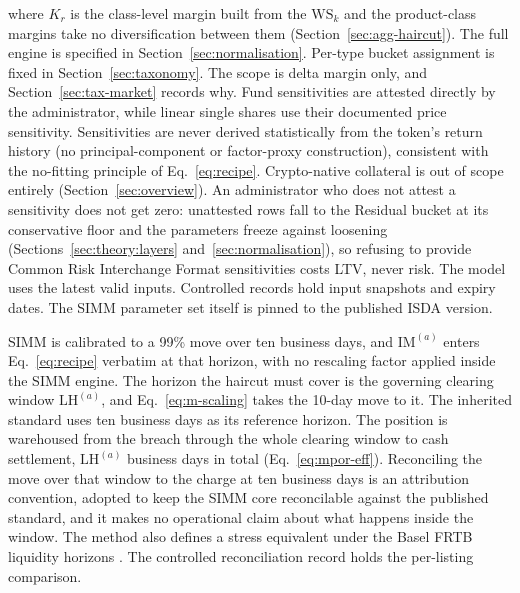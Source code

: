 where $K_r$ is the class-level margin built from the $\mathrm{WS}_k$ and the product-class margins take no diversification between them (Section~\ref{sec:agg-haircut}). The full engine is specified in Section~\ref{sec:normalisation}. Per-type bucket assignment is fixed in Section~\ref{sec:taxonomy}. The scope is delta margin only, and Section~\ref{sec:tax-market} records why. Fund sensitivities are attested directly by the administrator, while linear single shares use their documented price sensitivity. Sensitivities are never derived statistically from the token's return history (no principal-component or factor-proxy construction), consistent with the no-fitting principle of Eq.~\eqref{eq:recipe}. Crypto-native collateral is out of scope entirely (Section~\ref{sec:overview}). An administrator who does not attest a sensitivity does not get zero: unattested rows fall to the Residual bucket at its conservative floor and the parameters freeze against loosening (Sections~\ref{sec:theory:layers} and~\ref{sec:normalisation}), so refusing to provide Common Risk Interchange Format sensitivities costs LTV, never risk. The model uses the latest valid inputs. Controlled records hold input snapshots and expiry dates. The SIMM parameter set itself is pinned to the published ISDA version.

SIMM is calibrated to a 99\% move over ten business days, and $\mathrm{IM}^{(a)}$ enters Eq.~\eqref{eq:recipe} verbatim at that horizon, with no rescaling factor applied inside the SIMM engine. The horizon the haircut must cover is the governing clearing window $\mathrm{LH}^{(a)}$, and Eq.~\eqref{eq:m-scaling} takes the 10-day move to it. The inherited standard uses ten business days as its reference horizon. The position is warehoused from the breach through the whole clearing window to cash settlement, $\mathrm{LH}^{(a)}$ business days in total (Eq.~\eqref{eq:mpor-eff}). Reconciling the move over that window to the charge at ten business days is an attribution convention, adopted to keep the SIMM core reconcilable against the published standard, and it makes no operational claim about what happens inside the window. The method also defines a stress equivalent under the Basel FRTB liquidity horizons \cite{bcbs_frtb_d457}. The controlled reconciliation record holds the per-listing comparison.

